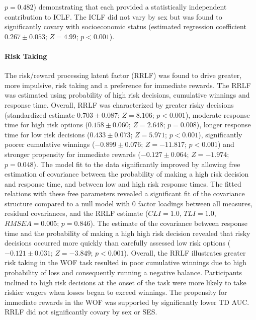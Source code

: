\documentclass[utf8]{frontiersSCNS} %
\begin{document}
$p=0.482$) demonstrating that each provided a statistically independent contribution to ICLF. The ICLF did not vary by sex but was found to significantly covary with socioeconomic status (estimated regression coefficient $0.267\pm0.053$; $Z=4.99$; $p<0.001$). 
\paragraph{Risk Taking} The risk/reward processing latent factor (RRLF) was found to drive greater, more impulsive, risk taking and a preference for immediate rewards. The RRLF was estimated using probability of high risk decisions, cumulative winnings and response time. Overall, RRLF was characterized by greater risky decisions (standardized estimate $0.703\pm0.087$; $Z=8.106$; $p<0.001$), moderate response time for high risk options ($0.158\pm0.060$; $Z=2.648$; $p=0.008$), longer response time for low risk decisions ($0.433\pm0.073$; $Z=5.971$; $p<0.001$), significantly poorer cumulative winnings ($-0.899\pm0.076$; $Z=-11.817$; $p<0.001$) and stronger propensity for immediate rewards ($-0.127\pm0.064$; $Z=-1.974$; $p=0.048$). The model fit to the data significantly improved by allowing free estimation of covariance between the probability of making a high risk decision and response time, and between low and high risk response times. The fitted relations with these free parameters revealed a significant fit of the covariance structure compared to a null model with 0 factor loadings between all measures, residual covariances, and the RRLF estimate ($CLI = 1.0$, $TLI = 1.0$, $RMSEA = 0.005$; $p = 0.846$). The estimate of the covariance between response time and the probability of making a high high risk decision revealed that risky decisions occurred more quickly than carefully assessed low risk options ($-0.121\pm0.031$; $Z=-3.849$; $p<0.001$). Overall, the RRLF illustrates greater risk taking in the WOF task resulted in poor cumulative winnings due to high probability of loss and consequently running a negative balance. Participants inclined to high risk decisions at the onset of the task were more likely to take riskier wagers when losses began to exceed winnings. The propensity for immediate rewards in the WOF was supported by significantly lower TD AUC. RRLF did not significantly covary by sex or SES.
\end{document}
